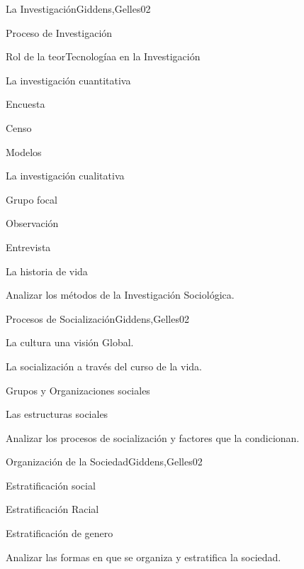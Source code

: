 \begin{syllabus}
\begin{unit}{La Investigación}{Giddens,Gelles}{0}{2}
    \begin{topics}
      \item Proceso de Investigación
      \item Rol de la teorTecnologíaa en la Investigación
      \item La investigación cuantitativa
      \item Encuesta
      \item Censo
      \item Modelos
      \item La investigación cualitativa
      \item Grupo focal
      \item Observación
      \item Entrevista
      \item La historia de vida
    \end{topics}
    \begin{unitgoals}
      \item Analizar los métodos de la Investigación Sociológica.
    \end{unitgoals}
\end{unit}

\begin{unit}{Procesos de Socialización}{Giddens,Gelles}{0}{2}
    \begin{topics}
      \item La cultura una visión Global.
      \item La socialización a través del curso de la vida.
      \item Grupos y Organizaciones sociales
      \item Las estructuras sociales
    \end{topics}
    \begin{unitgoals}
      \item Analizar los procesos de socialización y factores que la condicionan.
    \end{unitgoals}
\end{unit}

\begin{unit}{Organización de la Sociedad}{Giddens,Gelles}{0}{2}
    \begin{topics}
      \item Estratificación social
      \item Estratificación Racial
      \item Estratificación de genero
    \end{topics}
    \begin{unitgoals}
      \item Analizar las formas en que se organiza y estratifica la sociedad.
    \end{unitgoals}
\end{unit}


\end{syllabus}
